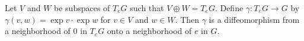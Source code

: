 Let $V$ and $W$ be subspaces of $T_e G$ such that $V \oplus W = T_e G$. Define $\gamma: T_e G \to G$ by $\gamma(v, w) = \exp v \cdot \exp w$ for $v \in V$ and $w \in W$. Then $\gamma$ is a diffeomorphism from a neighborhood of $0$ in $T_e G$ onto a neighborhood of $e$ in $G$.
